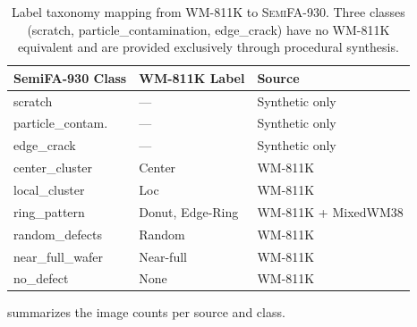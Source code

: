 \documentclass[conference]{IEEEtran}
\newcommand{\semidataset}{\textsc{SemiFA-930}}
\begin{document}
\begin{table}[t]
    \centering
    \caption{Label taxonomy mapping from WM-811K to \semidataset{}. Three classes (scratch, particle\_contamination, edge\_crack) have no WM-811K equivalent and are provided exclusively through procedural synthesis.}
    \label{tab:wm811k_mapping}
    \begin{tabular}{@{}lll@{}}
        \toprule
        \textbf{SemiFA-930 Class} & \textbf{WM-811K Label} & \textbf{Source} \\
        \midrule
        scratch              & ---              & Synthetic only \\
        particle\_contam.     & ---              & Synthetic only \\
        edge\_crack           & ---              & Synthetic only \\
        center\_cluster       & Center           & WM-811K \\
        local\_cluster        & Loc              & WM-811K \\
        ring\_pattern         & Donut, Edge-Ring & WM-811K + MixedWM38 \\
        random\_defects       & Random           & WM-811K \\
        near\_full\_wafer     & Near-full        & WM-811K \\
        no\_defect            & None             & WM-811K \\
        \bottomrule
    \end{tabular}
\end{table}

 summarizes the image counts per source and class.
\end{document}
